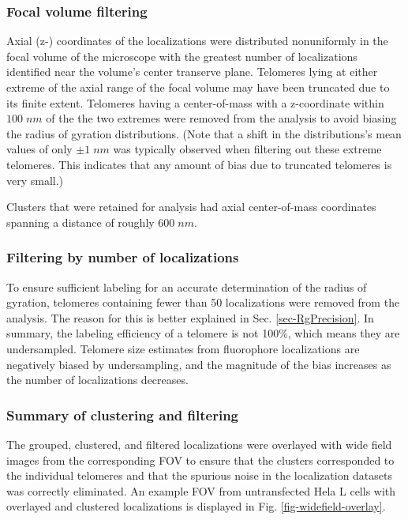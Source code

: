 \documentclass[12pt, a4paper]{article}
\begin{document}
\subsubsection{Focal volume filtering}
\label{sec-1-2-3}
Axial (z-) coordinates of the localizations were distributed
nonuniformly in the focal volume of the microscope with the
greatest number of localizations identified near the volume's
center transerve plane. Telomeres lying at either extreme of the
axial range of the focal volume may have been truncated due to its
finite extent. Telomeres having a center-of-mass with a
z-coordinate within $100 \; nm$ of the the two extremes were
removed from the analysis to avoid biasing the radius of gyration
distributions. (Note that a shift in the distributions's mean
values of only $\pm 1 \; nm$ was typically observed when filtering
out these extreme telomeres. This indicates that any amount of
bias due to truncated telomeres is very small.)

Clusters that were retained for analysis had axial center-of-mass
coordinates spanning a distance of roughly $600 \; nm$.

\subsubsection{Filtering by number of localizations}
\label{sec-1-2-4}
\label{sec-filter_num_loc}
To ensure sufficient labeling for an accurate determination of the
radius of gyration, telomeres containing fewer than 50
localizations were removed from the analysis. The reason for this
is better explained in Sec. \ref{sec-RgPrecision}. In summary, the
labeling efficiency of a telomere is not 100\%, which means they
are undersampled. Telomere size estimates from fluorophore
localizations are negatively biased by undersampling, and the
magnitude of the bias increases as the number of localizations
decreases.

\subsubsection{Summary of clustering and filtering}
\label{sec-1-2-5}
The grouped, clustered, and filtered localizations were overlayed
with wide field images from the corresponding FOV to ensure that
the clusters corresponded to the individual telomeres and that the
spurious noise in the localization datasets was correctly
eliminated. An example FOV from untransfected Hela L cells with
overlayed and clustered localizations is displayed in
Fig. \ref{fig-widefield-overlay}.
\end{document}

